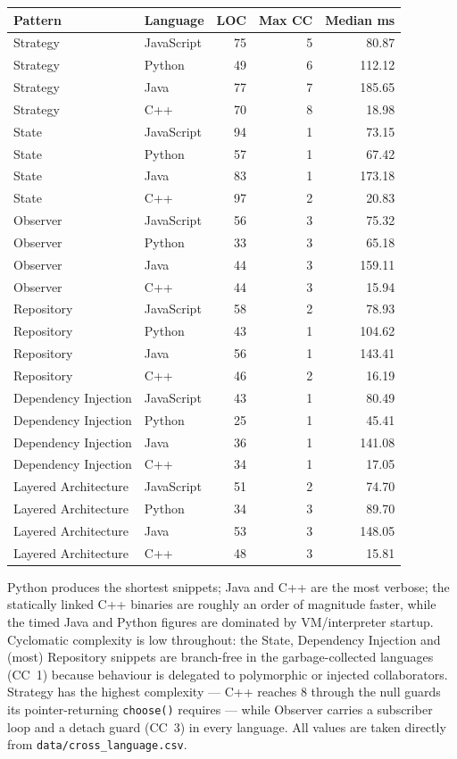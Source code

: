 \documentclass[11pt,a4paper]{article}
\begin{document}
\begin{center}
\small
\begin{tabular}{l l r r r}
\toprule
Pattern & Language & LOC & Max CC & Median ms \\
\midrule
Strategy & JavaScript & 75 & 5 & 80.87 \\
Strategy & Python & 49 & 6 & 112.12 \\
Strategy & Java & 77 & 7 & 185.65 \\
Strategy & C++ & 70 & 8 & 18.98 \\
\midrule
State & JavaScript & 94 & 1 & 73.15 \\
State & Python & 57 & 1 & 67.42 \\
State & Java & 83 & 1 & 173.18 \\
State & C++ & 97 & 2 & 20.83 \\
\midrule
Observer & JavaScript & 56 & 3 & 75.32 \\
Observer & Python & 33 & 3 & 65.18 \\
Observer & Java & 44 & 3 & 159.11 \\
Observer & C++ & 44 & 3 & 15.94 \\
\midrule
Repository & JavaScript & 58 & 2 & 78.93 \\
Repository & Python & 43 & 1 & 104.62 \\
Repository & Java & 56 & 1 & 143.41 \\
Repository & C++ & 46 & 2 & 16.19 \\
\midrule
Dependency Injection & JavaScript & 43 & 1 & 80.49 \\
Dependency Injection & Python & 25 & 1 & 45.41 \\
Dependency Injection & Java & 36 & 1 & 141.08 \\
Dependency Injection & C++ & 34 & 1 & 17.05 \\
\midrule
Layered Architecture & JavaScript & 51 & 2 & 74.70 \\
Layered Architecture & Python & 34 & 3 & 89.70 \\
Layered Architecture & Java & 53 & 3 & 148.05 \\
Layered Architecture & C++ & 48 & 3 & 15.81 \\
\bottomrule
\end{tabular}
\end{center}

Python produces the shortest snippets; Java and C++ are the most verbose; the
statically linked C++ binaries are roughly an order of magnitude faster, while the
timed Java and Python figures are dominated by VM/interpreter startup. Cyclomatic
complexity is low throughout: the State, Dependency Injection and (most)
Repository snippets are branch-free in the garbage-collected languages (CC~1)
because behaviour is delegated to polymorphic or injected collaborators.
Strategy has the highest complexity --- C++ reaches 8 through the null guards its
pointer-returning \texttt{choose()} requires --- while Observer carries a
subscriber loop and a detach guard (CC~3) in every language. All values are
taken directly from \texttt{data/cross\_language.csv}.
\end{document}
